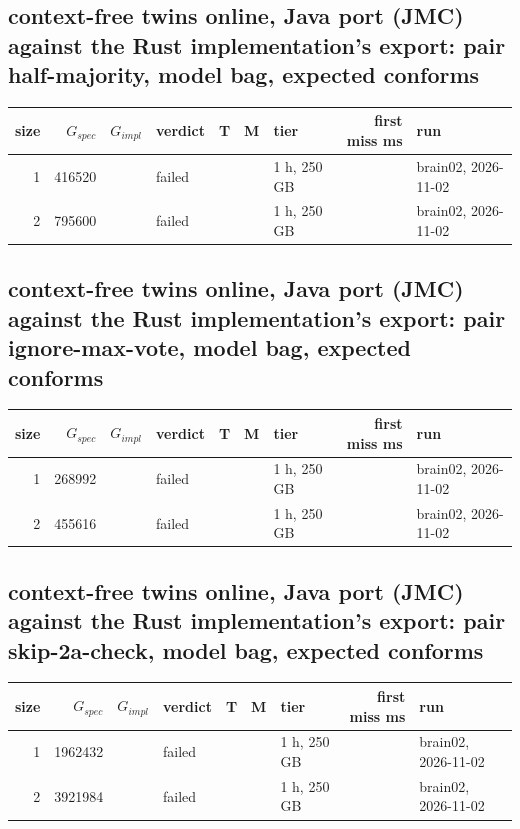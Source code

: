 \documentclass[10pt]{article}
\begin{document}
\subsection*{context-free twins online, Java port (JMC) against the Rust implementation's export: pair \textsf{half-majority}, model bag, expected conforms}
\begin{longtable}{@{}rrrlrrlrl@{}}
\toprule
size & $G_{\mathit{spec}}$ & $G_{\mathit{impl}}$ & verdict & T & M & tier & first miss ms & run \\
\midrule
\endhead
\color{blue} 1 & 416520 &  & failed &  &  & 1 h, 250 GB &  & brain02, 2026-11-02 \\
\color{blue} 2 & 795600 &  & failed &  &  & 1 h, 250 GB &  & brain02, 2026-11-02 \\
\bottomrule
\end{longtable}
\subsection*{context-free twins online, Java port (JMC) against the Rust implementation's export: pair \textsf{ignore-max-vote}, model bag, expected conforms}
\begin{longtable}{@{}rrrlrrlrl@{}}
\toprule
size & $G_{\mathit{spec}}$ & $G_{\mathit{impl}}$ & verdict & T & M & tier & first miss ms & run \\
\midrule
\endhead
\color{blue} 1 & 268992 &  & failed &  &  & 1 h, 250 GB &  & brain02, 2026-11-02 \\
\color{blue} 2 & 455616 &  & failed &  &  & 1 h, 250 GB &  & brain02, 2026-11-02 \\
\bottomrule
\end{longtable}
\subsection*{context-free twins online, Java port (JMC) against the Rust implementation's export: pair \textsf{skip-2a-check}, model bag, expected conforms}
\begin{longtable}{@{}rrrlrrlrl@{}}
\toprule
size & $G_{\mathit{spec}}$ & $G_{\mathit{impl}}$ & verdict & T & M & tier & first miss ms & run \\
\midrule
\endhead
\color{blue} 1 & 1962432 &  & failed &  &  & 1 h, 250 GB &  & brain02, 2026-11-02 \\
\color{blue} 2 & 3921984 &  & failed &  &  & 1 h, 250 GB &  & brain02, 2026-11-02 \\
\bottomrule
\end{longtable}
\end{document}
